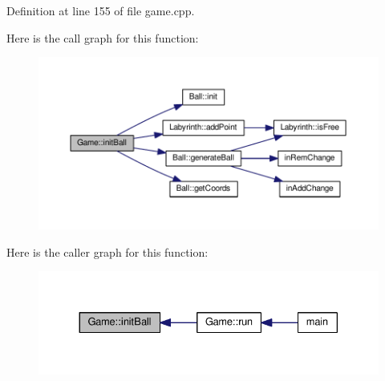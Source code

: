 Definition at line 155 of file game.\-cpp.



Here is the call graph for this function\-:
\nopagebreak
\begin{figure}[H]
\begin{center}
\leavevmode
\includegraphics[width=350pt]{class_game_a3702238c3fef205d19d1cb4bbc471c5c_cgraph}
\end{center}
\end{figure}




Here is the caller graph for this function\-:
\nopagebreak
\begin{figure}[H]
\begin{center}
\leavevmode
\includegraphics[width=330pt]{class_game_a3702238c3fef205d19d1cb4bbc471c5c_icgraph}
\end{center}
\end{figure}



